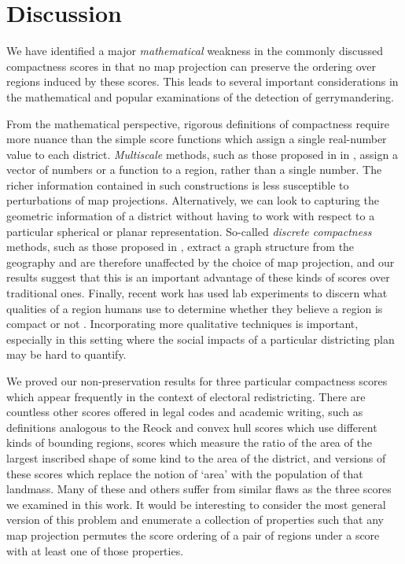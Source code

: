 \section{Discussion}



We have identified a major \textit{mathematical} weakness in the commonly discussed compactness scores in that no map projection can preserve the ordering over regions induced by these scores.  This leads to several important considerations in the mathematical and popular examinations of the detection of gerrymandering.

From the mathematical perspective, rigorous definitions of compactness require more nuance than the simple score functions which assign a single real-number value to each district.  \textit{Multiscale} methods, such as those proposed in in \cite{deford2018tv}, assign a vector of numbers or a function to a region, rather than a single number.  The richer information contained in such constructions is less susceptible to perturbations of map projections.
Alternatively, we can look to capturing the geometric information of a district without having to work with respect to a particular spherical or planar representation.  So-called \textit{discrete compactness} methods, such as those proposed in \cite{duchin2018discrete}, extract a graph structure from the geography and are therefore unaffected by the choice of map projection, and our results suggest that this is an important advantage of these kinds of scores over traditional ones.  Finally, recent work has used lab experiments to discern what qualities of a region humans use to determine whether they believe a region is compact or not \cite{kingeyeball}.  Incorporating more qualitative techniques is important, especially in this setting where the social impacts of a particular districting plan may be hard to quantify.


We proved our non-preservation results for three particular compactness scores which appear frequently in the context of electoral redistricting.  There are countless other scores offered in legal codes and academic writing, such as definitions analogous to the Reock and convex hull scores which use different kinds of bounding regions, scores which measure the ratio of the area of the largest inscribed shape of some kind to the area of the district, and versions of these scores which replace the notion of \enquote*{area} with the population of that landmass.  Many of these and others suffer from similar flaws as the three scores we examined in this work.  It would be interesting to consider the most general version of this problem and enumerate a collection of properties such that any map projection permutes the score ordering of a pair of regions under a score with at least one of those properties. 

